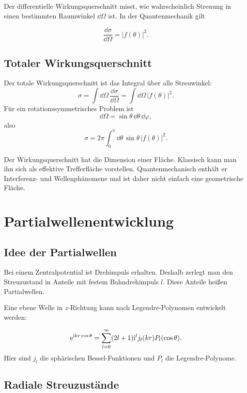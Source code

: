 Der differentielle Wirkungsquerschnitt misst, wie wahrscheinlich Streuung in einen bestimmten Raumwinkel \(\dd\Omega\) ist. In der Quantenmechanik gilt
\begin{definitionbox}
\[
    \frac{\dd\sigma}{\dd\Omega}=|f(\theta)|^2.
\]
\end{definitionbox}

\subsection{Totaler Wirkungsquerschnitt}

Der totale Wirkungsquerschnitt ist das Integral über alle Streuwinkel:
\[
    \sigma=\int\dd\Omega\,\frac{\dd\sigma}{\dd\Omega}
    =\int\dd\Omega\,|f(\theta)|^2.
\]
Für ein rotationssymmetrisches Problem ist
\[
    \dd\Omega=\sin\theta\,\dd\theta\,\dd\varphi,
\]
also
\[
    \sigma=2\pi\int_0^\pi\dd\theta\,\sin\theta\,|f(\theta)|^2.
\]

\begin{conceptbox}
Der Wirkungsquerschnitt hat die Dimension einer Fläche. Klassisch kann man ihn sich als effektive Trefferfläche vorstellen. Quantenmechanisch enthält er Interferenz- und Wellenphänomene und ist daher nicht einfach eine geometrische Fläche.
\end{conceptbox}

\section{Partialwellenentwicklung}

\subsection{Idee der Partialwellen}

Bei einem Zentralpotential ist Drehimpuls erhalten. Deshalb zerlegt man den Streuzustand in Anteile mit festem Bahndrehimpuls \(l\). Diese Anteile heißen Partialwellen.

Eine ebene Welle in \(z\)-Richtung kann nach Legendre-Polynomen entwickelt werden:
\begin{formulabox}
\[
    \mathrm{e}^{\mathrm{i} kr\cos\theta}
    =\sum_{l=0}^{\infty}(2l+1)\mathrm{i}^l j_l(kr)P_l(\cos\theta).
\]
Hier sind \(j_l\) die sphärischen Bessel-Funktionen und \(P_l\) die Legendre-Polynome.
\end{formulabox}

\subsection{Radiale Streuzustände}

